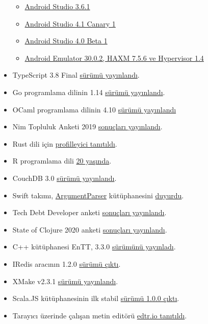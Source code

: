 \documentclass[11pt]{article}
\begin{document}
\begin{itemize}
\begin{itemize}
\item \href{https://androidstudio.googleblog.com/2020/02/android-studio-361-available.html}{Android Studio 3.6.1}
\item \href{https://androidstudio.googleblog.com/2020/02/android-studio-41-canary-1-available.html}{Android Studio 4.1 Canary 1}
\item \href{https://androidstudio.googleblog.com/2020/02/android-studio-40-beta-1-available.html}{Android Studio 4.0 Beta 1}
\item \href{https://androidstudio.googleblog.com/2020/02/emulator-3002-canary-haxm-756-and-amd.html}{Android Emulator 30.0.2, HAXM 7.5.6 ve Hypervisor 1.4}
\end{itemize}
\item TypeScript 3.8 Final \href{https://devblogs.microsoft.com/typescript/announcing-typescript-3-8/}{sürümü yayınlandı}.
\item Go programlama dilinin 1.14 \href{https://tip.golang.org/doc/go1.14}{sürümü yayınlandı}.
\item OCaml programlama dilinin 4.10 \href{https://discuss.ocaml.org/t/ocaml-4-10-released/5194}{sürümü yayınlandı}
\item Nim Topluluk Anketi 2019 \href{https://nim-lang.org/blog/2020/02/18/community-survey-results-2019.html}{sonuçları yayınlandı}.
\item Rust dili için \href{https://blog.rust-lang.org/inside-rust/2020/02/25/intro-rustc-self-profile.html}{profilleyici tanıtıldı}.
\item R programlama dili \href{https://twitter.com/\_R\_Foundation/status/1233671896144793600}{20 yaşında}.
\item CouchDB 3.0 \href{https://blog.couchdb.org/2020/02/26/3-0/}{sürümü yayınlandı}.
\item Swift takımı, \href{https://github.com/apple/swift-argument-parser}{ArgumentParser} kütüphanesini \href{https://swift.org/blog/argument-parser/}{duyurdu}.
\item Tech Debt Developer anketi \href{https://codeahoy.com/2020/02/17/technical-debt-survey/}{sonuçları yayınlandı}.
\item State of Clojure 2020 anketi \href{https://clojure.org/news/2020/02/20/state-of-clojure-2020}{sonuçları yayınlandı}.
\item C++ kütüphanesi EnTT, 3.3.0 \href{https://github.com/skypjack/entt/releases/tag/v3.3.0}{sürümünü yayınladı}.
\item IRedis aracının 1.2.0 \href{https://github.com/laixintao/iredis/releases/tag/v1.2.0}{sürümü çıktı}.
\item XMake v2.3.1 \href{https://tboox.org/2020/02/23/xmake-update-v2.3.1/}{sürümü yayınlandı}.
\item Scala.JS kütüphanesinin ilk stabil \href{https://www.scala-js.org/news/2020/02/25/announcing-scalajs-1.0.0/}{sürümü 1.0.0 çıktı}.
\item Tarayıcı üzerinde çalışan metin editörü \href{https://edtr.io/blog}{edtr.io tanıtıldı}.
\end{itemize}
\end{document}
